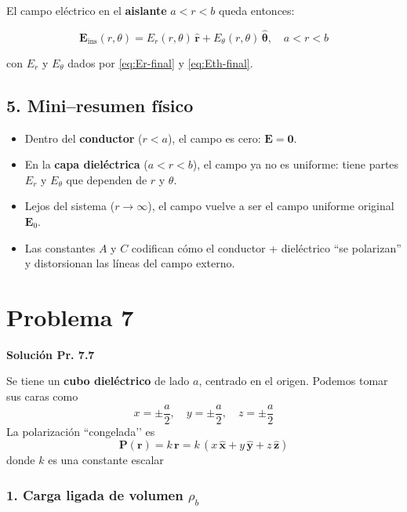 \documentclass{article}
\begin{document}
El campo eléctrico en el \textbf{aislante} $a<r<b$ queda entonces:

\begin{equation}
\boxed{
\mathbf{E}_{\text{ins}}(r,\theta)
= E_{r}(r,\theta)\,\hat{\mathbf{r}}
 + E_{\theta}(r,\theta)\,\hat{\boldsymbol{\theta}},
\quad a<r<b
}
\label{eq:E-ins-vector}
\end{equation}

con $E_{r}$ y $E_{\theta}$ dados por \eqref{eq:Er-final} y \eqref{eq:Eth-final}.

\subsection*{5. Mini–resumen físico}

\begin{itemize}
  \item Dentro del \textbf{conductor} ($r<a$), el campo es cero: $\mathbf{E}=\mathbf{0}$.
  \item En la \textbf{capa dieléctrica} ($a<r<b$), el campo ya no es uniforme: tiene partes $E_{r}$ y $E_{\theta}$ que dependen de $r$ y $\theta$.
  \item Lejos del sistema ($r\to\infty$), el campo vuelve a ser el campo uniforme original $\mathbf{E}_{0}$.
  \item Las constantes $A$ y $C$ codifican cómo el conductor + dieléctrico “se polarizan” y distorsionan las líneas del campo externo.
\end{itemize}


\section{Problema 7}

\textcolor{Cinnabar}{\textbf{Solución Pr. 7.7}} \vspace{0.4cm}

Se tiene un \textbf{cubo dieléctrico} de lado $a$, centrado en el origen.  
Podemos tomar sus caras como
\[
x = \pm \frac{a}{2},\quad
y = \pm \frac{a}{2},\quad
z = \pm \frac{a}{2}
\]
La polarización “congelada’’ es
\begin{equation}
\mathbf{P}(\mathbf{r}) = k\,\mathbf{r}
= k\,(x\,\hat{\mathbf{x}} + y\,\hat{\mathbf{y}} + z\,\hat{\mathbf{z}})
\label{eq:P-cubo}
\end{equation}
donde $k$ es una constante escalar

\subsubsection*{1. Carga ligada de volumen $\rho_{b}$}
\end{document}
